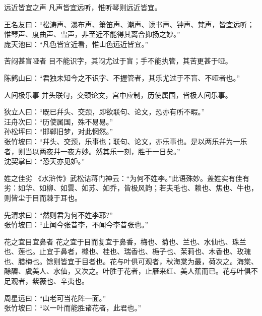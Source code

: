 \begin{yulu}{远近皆宜之声}
凡声皆宜远听，惟听琴则远近皆宜。
\begin{comments}
王名友曰：“松涛声、瀑布声、箫笛声、潮声、读书声、钟声、梵声，皆宜远听；惟琴声、度曲声、雪声，非至近不能得其离合抑扬之妙。” \\
庞天池曰：“凡色皆宜近看，惟山色远近皆宜。”
\end{comments}
\end{yulu}

\begin{yulu}{苦闷甚盲哑者}
目不能识字，其闷尤过于盲；手不能执管，其苦更甚于哑。
\begin{comments}
陈鹤山曰：“君独未知今之不识字、不握管者，其乐尤过于不盲、不哑者也。”
\end{comments}
\end{yulu}

\begin{yulu}{人间极乐事}
并头联句，交颈论文，宫中应制，历使属国，皆极人间乐事。
\begin{comments}
狄立人曰：“既已幷头、交颈，即欲联句、论文，恐亦有所不暇。” \\
汪舟次曰：“历使属国，殊不易易。” \\
孙松坪曰：“邯郸旧梦，对此惘然。” \\
张竹坡曰：“幷头、交颈，乐事也；联句、论文，亦乐事也。是以两乐幷为一乐者，则当以两夜幷一夜方妙。然其乐一刻，胜于一日矣。” \\
沈契掌曰：“恐天亦见妒。”
\end{comments}
\end{yulu}

\begin{yulu}{姓之佳劣}
《水浒传》武松诘蒋门神云：“为何不姓李。”此语殊妙。盖姓实有佳有劣：如华、如柳、如雲、如苏、如乔，皆极风韵；若夫毛也、赖也、焦也、牛也，则皆尘于目而棘于耳也。
\begin{comments}
先渭求曰：“然则君为何不姓李耶?” \\
张竹坡曰：“止闻今张昔李，不闻今李昔张也。”
\end{comments}
\end{yulu}

\begin{yulu}{花之宜目宜鼻者}
花之宜于目而复宜于鼻香，梅也、菊也、兰也、水仙也、珠兰也、莲也。止宜于鼻者，橼也、桂也、瑞香也、梔子也、茉莉也、木香也、玫瑰也、腊梅也。馀则皆宜于目者也。花与叶俱可观者，秋海棠为最，荷次之。海棠、酴醾、虞美人、水仙，又次之。叶胜于花者，止雁来红、美人蕉而已。花与叶俱不足观者，紫薇也、辛夷也。
\begin{comments}
周星远曰：“山老可当花阵一面。” \\
张竹坡曰：“以一叶而能胜诸花者，此君也。”
\end{comments}
\end{yulu}

